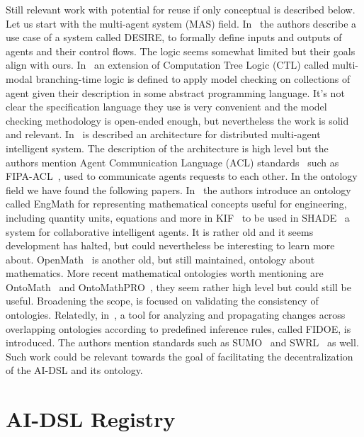 \documentclass[]{report}
\begin{document}
Still relevant work with potential for reuse if only conceptual is
described below.  Let us start with the multi-agent system (MAS)
field. In~\cite{Brazier1995} the authors describe a use case of a
system called DESIRE, to formally define inputs and outputs of agents
and their control flows.  The logic seems somewhat limited but their
goals align with ours.  In~\cite{Bourahla20055} an extension of
Computation Tree Logic (CTL) called multi-modal branching-time logic
is defined to apply model checking on collections of agent given their
description in some abstract programming language.  It's not clear the
specification language they use is very convenient and the model
checking methodology is open-ended enough, but nevertheless the work
is solid and relevant.  In~\cite{Desouky2007} is described an
architecture for distributed multi-agent intelligent system.  The
description of the architecture is high level but the authors mention
Agent Communication Language (ACL) standards~\cite{Labrou99thecurrent}
such as FIPA-ACL~\cite{FIPAACL}, used to communicate agents requests
to each other.  In the ontology field we have found the following
papers.  In~\cite{Gruber_anontology} the authors introduce an ontology
called EngMath for representing mathematical concepts useful for
engineering, including quantity units, equations and more in
KIF~\cite{KIF} to be used in SHADE~\cite{Gruber92towarda} a system for
collaborative intelligent agents.  It is rather old and it seems
development has halted, but could nevertheless be interesting to learn
more about.  OpenMath~\cite{Abbot1995} is another old, but still
maintained, ontology about mathematics.  More recent mathematical
ontologies worth mentioning are OntoMath~\cite{Elizarov2017} and
OntoMathPRO~\cite{nevzorova2014ontomathpro}, they seem rather high
level but could still be useful.  Broadening the scope,
\cite{Roelofs2020} is focused on validating the consistency of
ontologies.  Relatedly, in~\cite{Witherell2009}, a tool for analyzing
and propagating changes across overlapping ontologies according to
predefined inference rules, called FIDOE, is introduced.  The authors
mention standards such as SUMO~\cite{pease_standard_2009} and
SWRL~\cite{SWRL} as well.  Such work could be relevant towards the
goal of facilitating the decentralization of the AI-DSL and its
ontology.

\chapter{AI-DSL Registry}
\label{chap:aidsl_registry}
\end{document}
